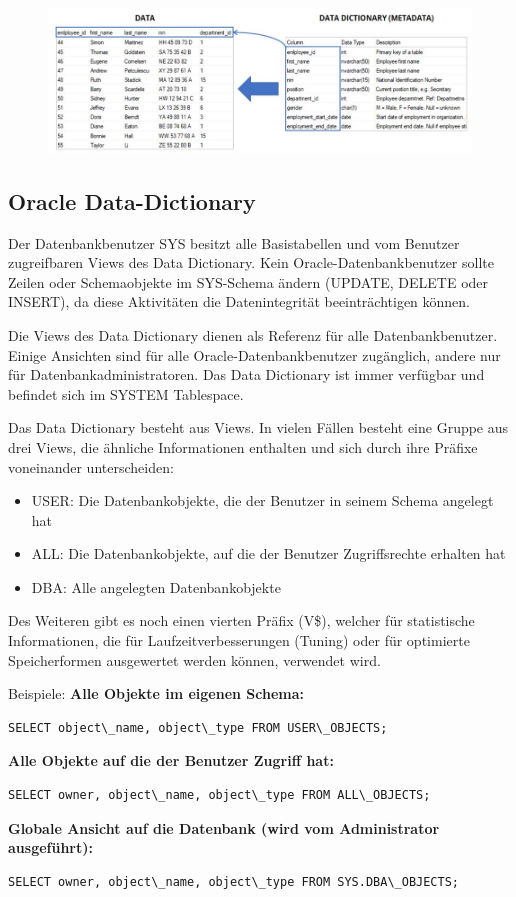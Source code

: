 \begin{figure}[h]
    \centering
    \includegraphics[width=.8\textwidth]{Content/images/modellierung/data.png}
    \caption{}
    \label{fig:modellierung:data}
\end{figure}

\subsection{Oracle Data-Dictionary}

Der Datenbankbenutzer SYS besitzt alle Basistabellen und vom Benutzer zugreifbaren Views des Data Dictionary.
Kein Oracle-Datenbankbenutzer sollte Zeilen oder Schemaobjekte im SYS-Schema ändern (UPDATE, DELETE oder INSERT), da diese Aktivitäten die Datenintegrität beeinträchtigen können.

Die Views des Data Dictionary dienen als Referenz für alle Datenbankbenutzer. Einige Ansichten sind für alle Oracle-Datenbankbenutzer zugänglich, andere nur für Datenbankadministratoren. 
Das Data Dictionary ist immer verfügbar und befindet sich im SYSTEM Tablespace.

Das Data Dictionary besteht aus Views. In vielen Fällen besteht eine Gruppe aus drei Views, die ähnliche Informationen enthalten und sich durch ihre Präfixe voneinander unterscheiden:

\begin{itemize}
    \item USER: Die Datenbankobjekte, die der Benutzer in seinem Schema angelegt hat
    \item ALL: Die Datenbankobjekte, auf die der Benutzer Zugriffsrechte erhalten hat 
    \item DBA: Alle angelegten Datenbankobjekte
\end{itemize}

Des Weiteren gibt es noch einen vierten Präfix (V\$), welcher für statistische Informationen, die für Laufzeitverbesserungen (Tuning) oder für optimierte Speicherformen ausgewertet werden können, verwendet wird.

Beispiele:
\textbf{Alle Objekte im eigenen Schema:}
\begin{lstlisting}
SELECT object\_name, object\_type FROM USER\_OBJECTS;    
\end{lstlisting}
\textbf{Alle Objekte auf die der Benutzer Zugriff hat:}
\begin{lstlisting}
SELECT owner, object\_name, object\_type FROM ALL\_OBJECTS;
\end{lstlisting}
\textbf{Globale Ansicht auf die Datenbank (wird vom Administrator ausgeführt):}
\begin{lstlisting}
SELECT owner, object\_name, object\_type FROM SYS.DBA\_OBJECTS;
\end{lstlisting}

